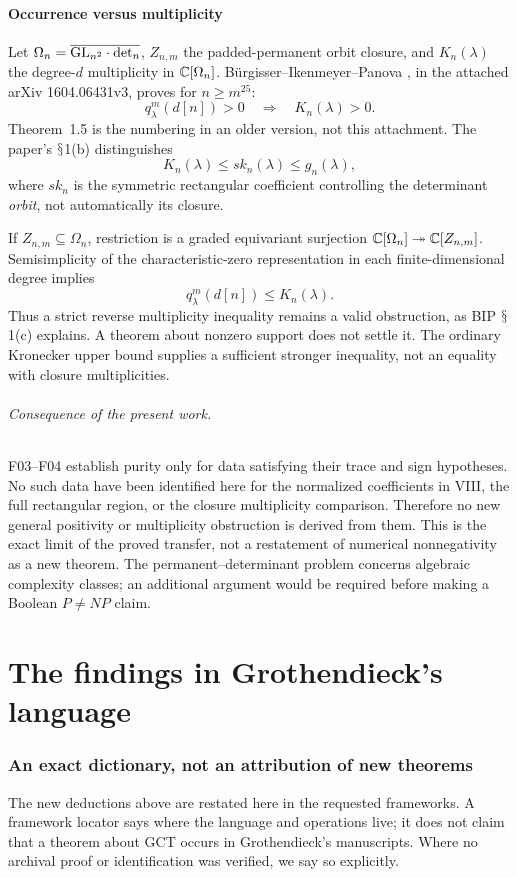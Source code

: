 \documentclass[11pt,a4paper]{article}
\renewcommand{\S}{\ensuremath{\mathsection}}
\newcommand{\fid}[1]{\textsf{#1}}\newcommand{\gate}[1]{\textsf{#1}}
\theoremstyle{named}\newtheorem{finding}{Finding}[section]
\theoremstyle{definition}\newtheorem{definition}[finding]{Definition}
\theoremstyle{remark}\newtheorem{remark}[finding]{Remark}
\begin{document}
\subsection{Occurrence versus multiplicity}
Let $\Omega_n=\overline{\mathrm{GL}_{n^2}\cdot\det_n}$, $Z_{n,m}$ the padded-permanent orbit closure, and $K_n(\lambda)$ the degree-$d$ multiplicity in $\mathbb C[\Omega_n]$. B\"urgisser--Ikenmeyer--Panova \cite[Theorem 1.4]{BIP}, in the attached arXiv 1604.06431v3, proves for $n\ge m^{25}$:
\[
 q^m_\lambda(d[n])>0\quad\Longrightarrow\quad K_n(\lambda)>0.
\]
Theorem~1.5 is the numbering in an older version, not this attachment. The paper's \S1(b) distinguishes
\[
 K_n(\lambda)\le sk_n(\lambda)\le g_n(\lambda),
\]
where $sk_n$ is the symmetric rectangular coefficient controlling the determinant \emph{orbit}, not automatically its closure.

If $Z_{n,m}\subseteq\Omega_n$, restriction is a graded equivariant surjection
$\mathbb C[\Omega_n]\twoheadrightarrow\mathbb C[Z_{n,m}]$. Semisimplicity of the characteristic-zero representation in each finite-dimensional degree implies
\[
 q^m_\lambda(d[n])\le K_n(\lambda).
\]
Thus a strict reverse multiplicity inequality remains a valid obstruction, as BIP \S1(c) explains. A theorem about nonzero support does not settle it. The ordinary Kronecker upper bound supplies a sufficient stronger inequality, not an equality with closure multiplicities.

\paragraph{Consequence of the present work.}
\fid{F03}--\fid{F04} establish purity only for data satisfying their trace and sign hypotheses. No such data have been identified here for the normalized coefficients in VIII, the full rectangular region, or the closure multiplicity comparison. Therefore no new general positivity or multiplicity obstruction is derived from them. This is the exact limit of the proved transfer, not a restatement of numerical nonnegativity as a new theorem. The permanent--determinant problem concerns algebraic complexity classes; an additional argument would be required before making a Boolean $P\ne NP$ claim.

\part{The findings in Grothendieck's language}
\section{An exact dictionary, not an attribution of new theorems}\label{sec:groth}
The new deductions above are restated here in the requested frameworks. A framework locator says where the language and operations live; it does not claim that a theorem about GCT occurs in Grothendieck's manuscripts. Where no archival proof or identification was verified, we say so explicitly.
\end{document}
